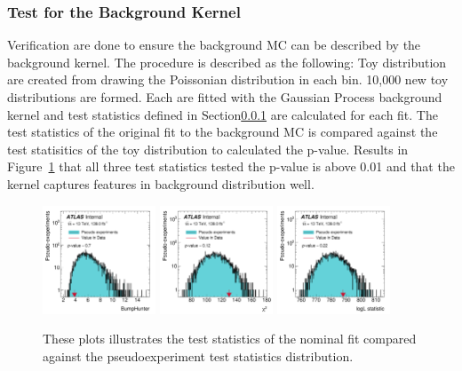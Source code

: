\subsubsection{Test for the Background Kernel}
Verification are done to ensure the background MC can be described by the background kernel. The procedure is described as the following: Toy distribution are created from drawing the Poissonian distribution in each bin. 10,000 new toy distributions are formed. Each are fitted with the Gaussian Process background kernel and test statistics defined in Section\ref{} are calculated for each fit. The test statistics of the original fit to the background MC is compared against the test statisitics of
the toy distribution to calculated the p-value. Results in Figure~\ref{fig:nominalstats} that all three test statistics tested the p-value is above 0.01 and that the kernel captures features in background distribution well. 

\begin{figure}[!htb]
    \begin{center}
        \includegraphics[width=0.30\textwidth]{figures/chapter_dimuon/bumpHunterStatPlot}        
        \includegraphics[width=0.30\textwidth]{figures/chapter_dimuon/chi2StatPlot}        
        \includegraphics[width=0.30\textwidth]{figures/chapter_dimuon/logLStatPlot}        
        \caption{
        These plots illustrates the test statistics of the nominal fit compared against the pseudoexperiment test statistics distribution. }
        \label{fig:nominalstats}
    \end{center}
\end{figure}
\FloatBarrier


